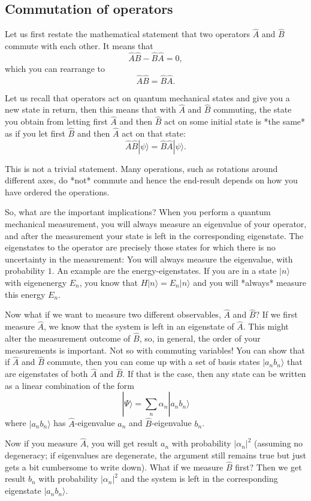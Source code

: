 \subsection{Commutation of operators}

Let us first restate the mathematical statement that two operators $\hat A$ and $\hat B$ commute with each other. It means that
$$\hat A \hat B - \hat B \hat A = 0,$$
which you can rearrange to 
$$\hat A \hat B = \hat B \hat A.$$

Let us recall that operators act on quantum mechanical states and give you a new state in return, then this means that with $\hat A$ and $\hat B$ commuting, the state you obtain from letting first $\hat A$ and then $\hat B$ act on some initial state is *the same* as if you let first $\hat B$ and then $\hat A$ act on that state:
$$\hat A \hat B | \psi \rangle = \hat B \hat A | \psi \rangle.$$

This is not a trivial statement. Many operations, such as rotations around different axes, do *not* commute and hence the end-result depends on how you have ordered the operations.

So, what are the important implications? When you perform a quantum mechanical measurement, you will always measure an eigenvalue of your operator, and after the measurement your state is left in the corresponding eigenstate. The eigenstates to the operator are precisely those states for which there is no uncertainty in the measurement: You will always measure the eigenvalue, with probability $1$.
An example are the energy-eigenstates. If you are in a state $|n\rangle$ with eigenenergy $E_n$, you know that $H|n\rangle = E_n |n \rangle$ and you will *always* measure this energy $E_n$.

Now what if we want to measure two different observables, $\hat A$ and $\hat B$? If we first measure $\hat A$, we know that the system is left in an eigenstate of $\hat A$. This might alter the measurement outcome of $\hat B$, so, in general, the order of your measurements is important. Not so with commuting variables! You can show that if $\hat A$ and $\hat B$ commute, then you can come up with a set of basis states $| a_n b_n\rangle$ that are eigenstates of both $\hat A$ and $\hat B$. If that is the case, then any state can be written as a linear combination of the form
$$| \Psi \rangle = \sum_n \alpha_n | a_n b_n \rangle$$
where $|a_n b_n\rangle$ has $\hat A$-eigenvalue $a_n$ and $\hat B$-eigenvalue $b_n$.

Now if you measure $\hat A$, you will get result $a_n$ with probability $|\alpha_n|^2$ (assuming no degeneracy; if eigenvalues are degenerate, the argument still remains true but just gets a bit cumbersome to write down). What if we measure $\hat B$ first? Then we get result $b_n$ with probability $|\alpha_n|^2$ and the system is left in the corresponding eigenstate $|a_n b_n \rangle$. 

